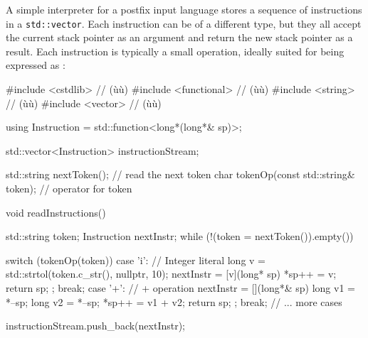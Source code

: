 A simple interpreter for a postfix input language stores a sequence of
instructions in a \lstinline!std::vector!. Each instruction can be of a
different type, but they all accept the current stack pointer as an
argument and return the new stack pointer as a result. Each instruction
is typically a small operation, ideally suited for being expressed as
:

\begin{emcppslisting}
#include <cstdlib>     // (ù{}ù)
#include <functional>  // (ù{}ù)
#include <string>      // (ù{}ù)
#include <vector>      // (ù{}ù)

using Instruction = std::function<long*(long*& sp)>;

std::vector<Instruction> instructionStream;

std::string nextToken();                 // read the next token
char tokenOp(const std::string& token);  // operator for token

void readInstructions()
{
    std::string token;
    Instruction nextInstr;
    while (!(token = nextToken()).empty())
    {
        switch (tokenOp(token))
        {
            case 'i':
            {
                // Integer literal
                long v = std::strtol(token.c_str(), nullptr, 10);
                nextInstr = [v](long* sp){ *sp++ = v; return sp; };
                break;
            }
            case '+':
            {
                // + operation
                nextInstr = [](long*& sp){
                    long v1 = *--sp;
                    long v2 = *--sp;
                    *sp++ = v1 + v2;
                    return sp;
                };
                break;
            }
            // ... more cases
        }

        instructionStream.push_back(nextInstr);
    }
}
\end{emcppslisting}


